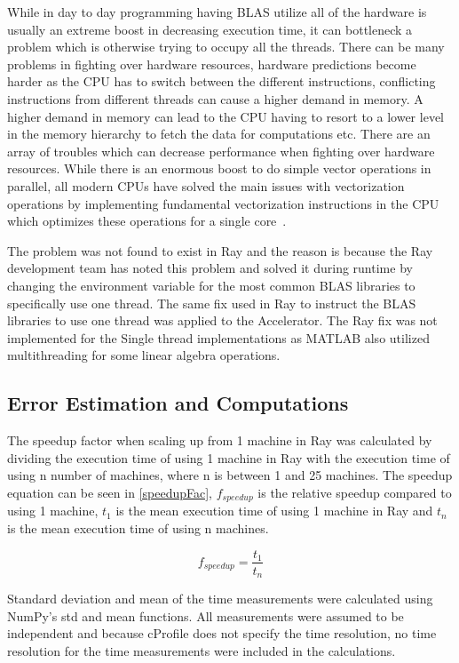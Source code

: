 \documentclass[12pt, a4paper]{article}
\begin{document}
While in day to day programming having BLAS utilize all of the hardware is usually an extreme boost in decreasing execution time, it can bottleneck a problem which is otherwise trying to occupy all the threads. 
There can be many problems in fighting over hardware resources, hardware predictions become harder as the CPU has to switch between the different instructions, conflicting instructions from different threads can cause a higher demand in memory.
A higher demand in memory can lead to the CPU having to resort to a lower level in the memory hierarchy to fetch the data for computations etc. 
There are an array of troubles which can decrease performance when fighting over hardware resources.
While there is an enormous boost to do simple vector operations in parallel, all modern CPUs have solved the main issues with vectorization operations by implementing fundamental vectorization instructions in the CPU which optimizes these operations for a single core~\cite{enwiki:avx}.

The problem was not found to exist in Ray and the reason is because the Ray development team has noted this problem and solved it during runtime by changing the environment variable for the most common BLAS libraries to specifically use one thread. 
The same fix used in Ray to instruct the BLAS libraries to use one thread was applied to the Accelerator.
The Ray fix was not implemented for the Single thread implementations as MATLAB also utilized multithreading for some linear algebra operations. 

\subsection{Error Estimation and Computations}

The speedup factor when scaling up from 1 machine in Ray was calculated by dividing the execution time of using 1 machine in Ray with the execution time of using n number of machines, where n is between 1 and 25 machines.
The speedup equation can be seen in \cref{speedupFac}, $f_{speedup}$ is the relative speedup compared to using 1 machine, $t_1$ is the mean execution time of using 1 machine in Ray and $t_n$ is the mean execution time of using n machines.

\begin{equation}\label{speedupFac}
    f_{speedup} = \frac{t_1}{t_n}
\end{equation}

Standard deviation and mean of the time measurements were calculated using NumPy's std and mean functions.
All measurements were assumed to be independent and because cProfile does not specify the time resolution, no time resolution for the time measurements were included in the calculations.
\end{document}
